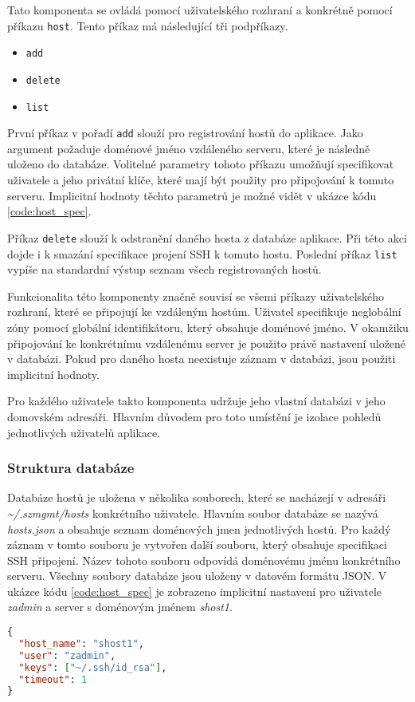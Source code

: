 Tato komponenta se ovládá pomocí uživatelského rozhraní a konkrétně pomocí příkazu \verb|host|. Tento příkaz má následující
tři podpříkazy.
\begin{itemize}
 \item \verb|add|
 \item \verb|delete|
 \item \verb|list|
\end{itemize}
První příkaz v pořadí \verb|add| slouží pro registrování hostů do aplikace. Jako argument požaduje doménové jméno vzdáleného
serveru, které je následně uloženo do databáze. Volitelné parametry tohoto příkazu umožňují specifikovat uživatele a jeho
privátní klíče, které mají být použity pro připojování k tomuto serveru. Implicitní hodnoty těchto parametrů je možné vidět
v ukázce kódu \ref{code:host_spec}.

Příkaz \verb|delete| slouží k odstranění daného hosta z databáze aplikace. Při této akci dojde i k smazání specifikace projení
SSH k tomuto hostu. Poslední příkaz \verb|list| vypíše na standardní výstup seznam všech registrovaných hostů.

Funkcionalita této komponenty značně souvisí se všemi příkazy uživatelského rozhraní, které se připojují ke vzdáleným hostům.
Uživatel specifikuje neglobální zóny pomocí globální identifikátoru, který obsahuje doménové jméno. V okamžiku připojování
ke konkrétnímu vzdálenému server je použito právě nastavení uložené v databázi. Pokud pro daného hosta neexistuje záznam
v databázi, jsou použiti implicitní hodnoty.

Pro každého uživatele takto komponenta udržuje jeho vlastní databázi v jeho domovském adresáři. Hlavním důvodem pro toto umístění
je izolace pohledů jednotlivých uživatelů aplikace.
\subsubsection{Struktura databáze}
\label{chapter:implementation:client:hosts:database}
Databáze hostů je uložena v několika souborech, které se nacházejí v adresáři \textit{\textasciitilde/.szmgmt/hosts} konkrétního uživatele.
Hlavním soubor databáze se nazývá \textit{hosts.json} a obsahuje seznam doménových jmen jednotlivých hostů. Pro každý záznam 
v tomto souboru je vytvořen další souboru, který obsahuje specifikaci SSH připojení. Název tohoto souboru odpovídá doménovému
jménu konkrétního serveru. Všechny soubory databáze jsou uloženy v datovém formátu JSON. V ukázce kódu \ref{code:host_spec}
je zobrazeno implicitní nastavení pro uživatele \textit{zadmin} a server s doménovým jménem \textit{shost1}.
\begin{lstlisting}[language=json, caption={Implicitní nastavení parametrů SSH připojení}, float,label={code:host_spec}]  
{
  "host_name": "shost1",
  "user": "zadmin",
  "keys": ["~/.ssh/id_rsa"],
  "timeout": 1
}
\end{lstlisting}
